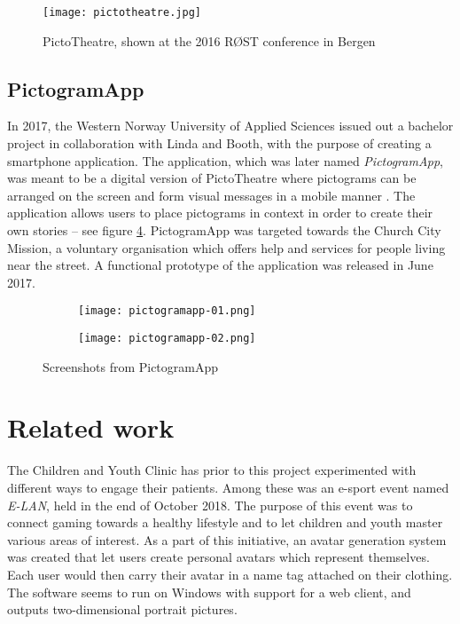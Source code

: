 \begin{figure}
    \centering
    \texttt{[image: pictotheatre.jpg]}
    \caption{PictoTheatre, shown at the 2016 RØST conference in Bergen}
    \label{fig:pictotheatre}
\end{figure}

\subsection{PictogramApp}

In 2017, the Western Norway University of Applied Sciences issued out a bachelor project in collaboration with Linda and Booth, with the purpose of creating a smartphone application. The application, which was later named \emph{PictogramApp}, was meant to be a digital version of PictoTheatre where pictograms can be arranged on the screen and form visual messages in a mobile manner \parencite{fure2017}. The application allows users to place pictograms in context in order to create their own stories -- see figure \ref{fig:pictogramapp}. PictogramApp was targeted towards the Church City Mission, a voluntary organisation which offers help and services for people living near the street. A functional prototype of the application was released in June 2017.

\begin{figure}
    \centering
    \begin{subfigure}{0.3\textwidth}
        \centering
        \texttt{[image: pictogramapp-01.png]}
        \label{fig:pictogramapp-list}
    \end{subfigure}
    \hspace{0.05\textwidth}
    \begin{subfigure}{0.3\textwidth}
        \centering
        \texttt{[image: pictogramapp-02.png]}
        \label{fig:pictogramapp-scene}
    \end{subfigure}
    \caption{Screenshots from PictogramApp}
    \label{fig:pictogramapp}
\end{figure}

\section{Related work}
\label{sec:relatedwork}

The Children and Youth Clinic has prior to this project experimented with different ways to engage their patients. Among these was an e-sport event named \emph{E-LAN}, held in the end of October 2018. The purpose of this event was to connect gaming towards a healthy lifestyle and to let children and youth master various areas of interest. As a part of this initiative, an avatar generation system was created that let users create personal avatars which represent themselves. Each user would then carry their avatar in a name tag attached on their clothing. The software seems to run on Windows with support for a web client, and outputs two-dimensional portrait pictures.

